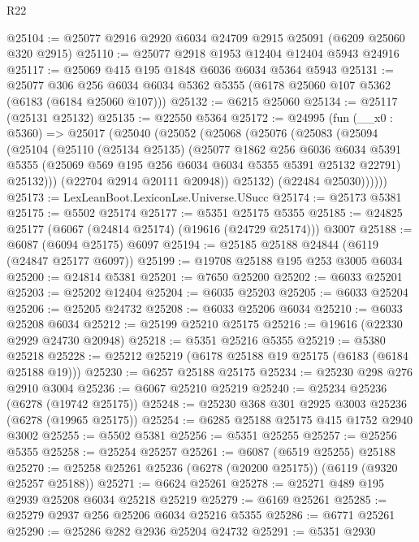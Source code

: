 \begin{lexlean}{R22}
\begin{coremodule}
@25104 := @25077 @2916 @2920 @6034 @24709 @2915 @25091 (@6209 @25060 @320 @2915)
@25110 := @25077 @2918 @1953 @12404 @12404 @5943 @24916
@25117 := @25069 @415 @195 @1848 @6036 @6034 @5364 @5943
@25131 := @25077
    @306
    @256
    @6034
    @6034
    @5362
    @5355
    (@6178 @25060 @107 @5362 (@6183 (@6184 @25060 @107)))
@25132 := @6215 @25060
@25134 := @25117 (@25131 @25132)
@25135 := @22550 @5364
@25172 := @24995
    (fun (__x0 : @5360) =>
    @25017
      (@25040
        (@25052
          (@25068
            (@25076
              (@25083
                (@25094
                  (@25104
                    (@25110
                      (@25134 @25135)
                      (@25077
                        @1862
                        @256
                        @6036
                        @6034
                        @5391
                        @5355
                        (@25069 @569 @195 @256 @6034 @6034 @5355 @5391 @25132 @22791)
                        @25132)))
                  (@22704 @2914 @20111 @20948))
                @25132)
              (@22484 @25030))))))
@25173 := LexLeanBoot.LexiconLse.Universe.USucc
@25174 := @25173 @5381
@25175 := @5502 @25174
@25177 := @5351 @25175 @5355
@25185 := @24825 @25177 (@6067 (@24814 @25174) (@19616 (@24729 @25174))) @3007
@25188 := @6087 (@6094 @25175) @6097
@25194 := @25185 @25188 @24844 (@6119 (@24847 @25177 @6097))
@25199 := @19708 @25188 @195 @253 @3005 @6034
@25200 := @24814 @5381
@25201 := @7650 @25200
@25202 := @6033 @25201
@25203 := @25202 @12404
@25204 := @6035 @25203
@25205 := @6033 @25204
@25206 := @25205 @24732
@25208 := @6033 @25206 @6034
@25210 := @6033 @25208 @6034
@25212 := @25199 @25210 @25175
@25216 := @19616 (@22330 @2929 @24730 @20948)
@25218 := @5351 @25216 @5355
@25219 := @5380 @25218
@25228 := @25212 @25219 (@6178 @25188 @19 @25175 (@6183 (@6184 @25188 @19)))
@25230 := @6257 @25188 @25175
@25234 := @25230 @298 @276 @2910 @3004
@25236 := @6067 @25210 @25219
@25240 := @25234 @25236 (@6278 (@19742 @25175))
@25248 := @25230 @368 @301 @2925 @3003 @25236 (@6278 (@19965 @25175))
@25254 := @6285 @25188 @25175 @415 @1752 @2940 @3002
@25255 := @5502 @5381
@25256 := @5351 @25255
@25257 := @25256 @5355
@25258 := @25254 @25257
@25261 := @6087 (@6519 @25255) @25188
@25270 := @25258 @25261 @25236 (@6278 (@20200 @25175)) (@6119 (@9320 @25257 @25188))
@25271 := @6624 @25261
@25278 := @25271 @489 @195 @2939 @25208 @6034 @25218 @25219
@25279 := @6169 @25261
@25285 := @25279 @2937 @256 @25206 @6034 @25216 @5355
@25286 := @6771 @25261
@25290 := @25286 @282 @2936 @25204 @24732
@25291 := @5351 @2930

\end{coremodule}
\end{lexlean}
